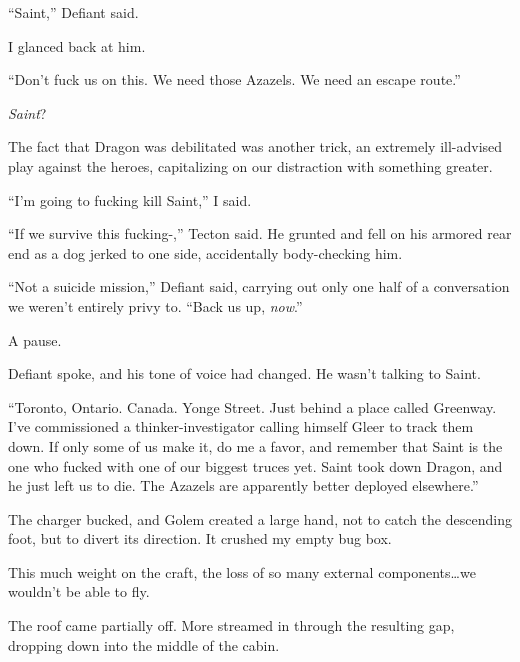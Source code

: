 ``Saint,'' Defiant said.



I glanced back at him.



``Don't fuck us on this.  We need those Azazels.  We need an escape route.''



\emph{Saint}?



The fact that Dragon was debilitated was another trick, an extremely ill-advised play against the heroes, capitalizing on our distraction with something greater.



``I'm going to fucking kill Saint,'' I said.



``If we survive this fucking-,'' Tecton said.  He grunted and fell on his armored rear end as a dog jerked to one side, accidentally body-checking him.



``Not a suicide mission,'' Defiant said, carrying out only one half of a conversation we weren't entirely privy to.  ``Back us up, \emph{now}.''



A pause.



Defiant spoke, and his tone of voice had changed.  He wasn't talking to Saint.



``Toronto, Ontario.  Canada.  Yonge Street.  Just behind a place called Greenway.  I've commissioned a thinker-investigator calling himself Gleer to track them down.  If only some of us make it, do me a favor, and remember that Saint is the one who fucked with one of our biggest truces yet.  Saint took down Dragon, and he just left us to die.  The Azazels are apparently better deployed elsewhere.''



The charger bucked, and Golem created a large hand, not to catch the descending foot, but to divert its direction.  It crushed my empty bug box.



This much weight on the craft, the loss of so many external components\ldots we wouldn't be able to fly.



The roof came partially off.  More streamed in through the resulting gap, dropping down into the middle of the cabin.



